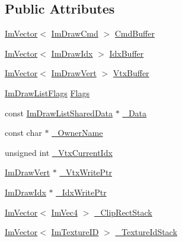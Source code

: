 \subsection*{Public Attributes}
\begin{DoxyCompactItemize}
\item 
\mbox{\hyperlink{class_im_vector}{Im\+Vector}}$<$ \mbox{\hyperlink{struct_im_draw_cmd}{Im\+Draw\+Cmd}} $>$ \mbox{\hyperlink{struct_im_draw_list_a67a4b5cc4c83bc3b81d96c46cbd38a07}{Cmd\+Buffer}}
\item 
\mbox{\hyperlink{class_im_vector}{Im\+Vector}}$<$ \mbox{\hyperlink{imgui_8h_afdc8744a5ac1a968b1ddfa47e13b2fa1}{Im\+Draw\+Idx}} $>$ \mbox{\hyperlink{struct_im_draw_list_adf292ff70a954d82daf061c609e75dfc}{Idx\+Buffer}}
\item 
\mbox{\hyperlink{class_im_vector}{Im\+Vector}}$<$ \mbox{\hyperlink{struct_im_draw_vert}{Im\+Draw\+Vert}} $>$ \mbox{\hyperlink{struct_im_draw_list_aa8ff4aee39cf3c3791b7e29a7b4264be}{Vtx\+Buffer}}
\item 
\mbox{\hyperlink{imgui_8h_a1adb61806505bf501bb0fbcdf4414360}{Im\+Draw\+List\+Flags}} \mbox{\hyperlink{struct_im_draw_list_ada2c004661663ef875f4d4c7ec0b4557}{Flags}}
\item 
const \mbox{\hyperlink{struct_im_draw_list_shared_data}{Im\+Draw\+List\+Shared\+Data}} $\ast$ \mbox{\hyperlink{struct_im_draw_list_a606bbd354211fe6f84cc11ebe53e7903}{\+\_\+\+Data}}
\item 
const char $\ast$ \mbox{\hyperlink{struct_im_draw_list_a643f385fb9d5fc35a431e72a10a212f5}{\+\_\+\+Owner\+Name}}
\item 
unsigned int \mbox{\hyperlink{struct_im_draw_list_a2228793183665bc3d8612795555fe505}{\+\_\+\+Vtx\+Current\+Idx}}
\item 
\mbox{\hyperlink{struct_im_draw_vert}{Im\+Draw\+Vert}} $\ast$ \mbox{\hyperlink{struct_im_draw_list_a67f870f5140bf1cab14b8515b7386073}{\+\_\+\+Vtx\+Write\+Ptr}}
\item 
\mbox{\hyperlink{imgui_8h_afdc8744a5ac1a968b1ddfa47e13b2fa1}{Im\+Draw\+Idx}} $\ast$ \mbox{\hyperlink{struct_im_draw_list_a771f4c7f71873852fe030c3e498e5843}{\+\_\+\+Idx\+Write\+Ptr}}
\item 
\mbox{\hyperlink{class_im_vector}{Im\+Vector}}$<$ \mbox{\hyperlink{struct_im_vec4}{Im\+Vec4}} $>$ \mbox{\hyperlink{struct_im_draw_list_ae950024f053f3c94dc2c763d20be609d}{\+\_\+\+Clip\+Rect\+Stack}}
\item 
\mbox{\hyperlink{class_im_vector}{Im\+Vector}}$<$ \mbox{\hyperlink{imgui_8h_a364f4447ecbc4ca176145ccff9db6286}{Im\+Texture\+ID}} $>$ \mbox{\hyperlink{struct_im_draw_list_a848faddd121da050214b8d8159e5e704}{\+\_\+\+Texture\+Id\+Stack}}

\end{DoxyCompactItemize}
